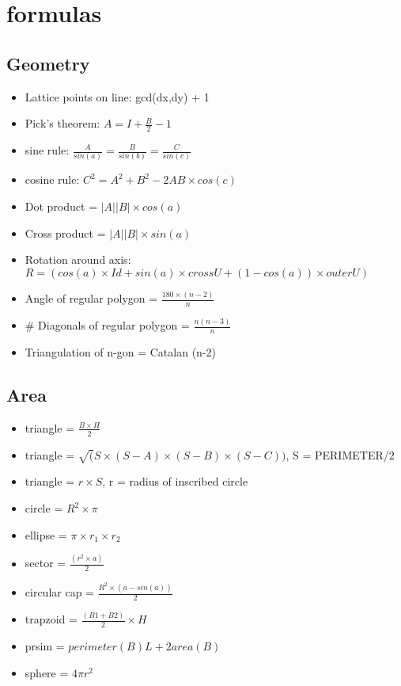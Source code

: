 \section{formulas}
\subsection{Geometry}
\begin{itemize}
\item Lattice points on line: gcd(dx,dy) + 1
\item Pick's theorem: $A = I + \frac{B}{2} - 1$
\item sine rule: $\frac{A}{sin(a)} = \frac{B}{sin(b)} = \frac{C}{sin(c)}$
\item cosine rule: $C^2=A^2+B^2-2AB \times cos(c)$
\item Dot product = $|A| |B| \times cos(a)$
\item Cross product = $|A| |B| \times sin(a)$
\item Rotation around axis: $R = (cos(a) \times Id + sin(a) \times cross U + (1 - cos(a)) \times outer U)$
\item Angle of regular polygon = $\frac{180 \times (n-2)}{n}$
\item \# Diagonals of regular polygon = $\frac{n (n-3)}{n}$
\item Triangulation of n-gon = Catalan (n-2)
\end{itemize}
\hrulefill
\subsection{Area}
\begin{itemize}
\item triangle = $\frac{B \times H}{2}$
\item triangle = $\sqrt(S \times (S-A) \times (S-B) \times (S-C))$, S = PERIMETER/2
\item triangle = $r \times S$, r = radius of inscribed circle
\item circle = $R^2 \times \pi$
\item ellipse = $\pi \times r_1 \times r_2$
\item sector = $\frac{(r^2 \times a)}{2}$
\item circular cap = $\frac{R^2 \times (a-sin(a))}{2}$
\item trapzoid = $\frac{(B1 + B2)}{2} \times H$
\item prsim = $perimeter(B) L + 2 area(B)$
\item sphere = $4 \pi r^2$
\end{itemize}
\hrulefill
